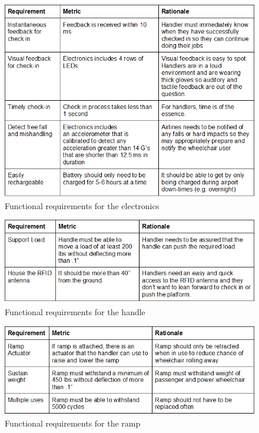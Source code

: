 \newpage

\begin{figure}[h!]
  \centering
     \includegraphics[scale=1]{images/functional_requirements_electronics.png}
   \caption{Functional requirements for the electronics}
  \label{fig:fun_req_electronics}
\end{figure}

\newpage

\begin{figure}[h!]
  \centering
     \includegraphics[scale=1]{images/functional_requirements_handle.png}
   \caption{Functional requirements for the handle}
  \label{fig:fun_req_handle}
\end{figure}

\newpage

\begin{figure}[h!]
  \centering
     \includegraphics[scale=1]{images/functional_requirements_ramp.png}
   \caption{Functional requirements for the ramp}
  \label{fig:fun_req_ramp}
\end{figure}

